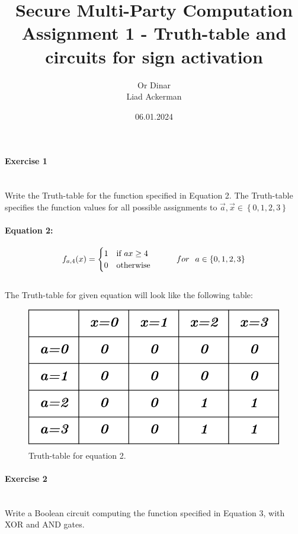 \documentclass{article}
\title{\textbf{Secure Multi-Party Computation
}Assignment 1 - Truth-table and circuits for sign activation\textbf{}}
\author{Or Dinar \\
Liad Ackerman}
\date{06.01.2024}
\begin{document}
\maketitle

\paragraph{\LARGE Exercise 1\\\\}

Write the Truth-table for the function specified in Equation 2. The Truth-table specifies the function values for all possible assignments to $\overrightarrow{a},\overrightarrow{x}\in \left\{ 0,1,2,3\right\}$

\paragraph{Equation 2:}

$$
f_{a,4}(x)=\begin{cases}
			1 & \text{if $ax \geq 4$ }\\
            0 & \text{otherwise}
		 \end{cases} \hspace{1cm} for \hspace{.25cm}a\in \left\{ 0,1,2,3\right\}
$$
\\
The Truth-table for given equation will look like the following table:

\begin{figure}[H]
    \centering
    \includegraphics[width=0.5\linewidth]{Picture1.png}
    \caption{Truth-table for equation 2.}
    \label{fig:enter-label}
\end{figure}
\newpage 
\paragraph{\LARGE Exercise 2\\\\}

Write a Boolean circuit computing the function specified in Equation 3, with XOR
and AND gates.
\end{document}
